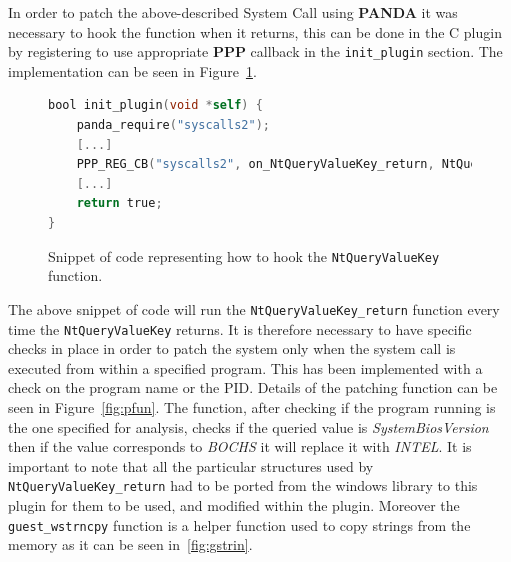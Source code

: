 In order to patch the above-described System Call using \textbf{PANDA} it was necessary to hook the function when it returns, this can be done in the C plugin by registering to use appropriate \textbf{PPP} callback in the \lstinline{init_plugin} section. The implementation can be seen in Figure~\ref{fig:pinit}.

\begin{figure}[htp]
\centering
\begin{lstlisting}[language=C]
bool init_plugin(void *self) {
    panda_require("syscalls2");
    [...]
    PPP_REG_CB("syscalls2", on_NtQueryValueKey_return, NtQueryValueKey_return);
    [...]
    return true;
}
\end{lstlisting}
\caption{Snippet of code representing how to hook the \lstinline{NtQueryValueKey} function.}
\label{fig:pinit}
\end{figure} 

The above snippet of code will run the \lstinline{NtQueryValueKey_return} function every time the \lstinline{NtQueryValueKey} returns. It is therefore necessary to have specific checks in place in order to patch the system only when the system call is executed from within a specified program. This has been implemented with a check on the program name or the PID. Details of the patching function can be seen in Figure~\ref{fig:pfun}. The function, after checking if the program running is the one specified for analysis, checks if the queried value is \textit{SystemBiosVersion} then if the value corresponds to \textit{BOCHS} it will replace it with \textit{INTEL}. It is important to note that all the particular structures used by \lstinline{NtQueryValueKey_return} had to be ported from the windows library to this plugin for them to be used, and modified within the plugin. Moreover the \lstinline{guest_wstrncpy} function is a helper function used to copy strings from the memory as it can be seen in~\ref{fig:gstrin}.

